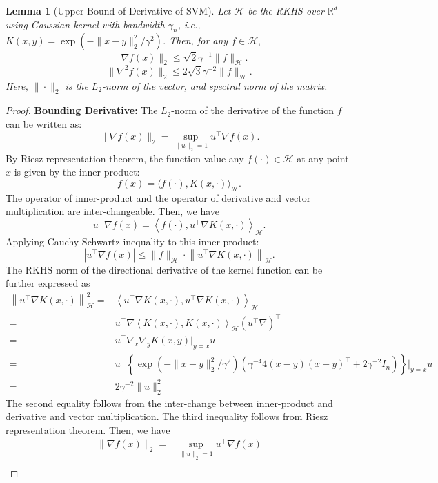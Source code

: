 \documentclass[12pt]{article}
\newtheorem{lemma}{Lemma}%
\newcommand{\R}{\mathbb{R}}
\begin{document}
\begin{lemma}[Upper Bound of Derivative of SVM]\label{lemma:derivative_svm}
Let $\mathcal{H}$ be the RKHS over $\R^{d}$ using Gaussian kernel with bandwidth $\gamma_n$, i.e., $K(x,y) = \exp(-\|x-y\|_2^2/\gamma^2)$. Then, for any $f\in\mathcal{H},$
$$\|\nabla f(x)\|_2 \leq  \sqrt{2}\gamma^{-1} \|f\|_{\mathcal{H}}.$$
$$\|\nabla^2 f(x)\|_2 \leq  2\sqrt{3}\gamma^{-2} \|f\|_{\mathcal{H}}.$$
Here, $\|\cdot\|_2$ is the $L_2$-norm of the vector, and spectral norm of the matrix.
\end{lemma}
\begin{proof}\textbf{Bounding Derivative:}
The $L_2$-norm of the derivative of the function  $f$ can be written as: 
    $$\|\nabla f(x)\|_2 = \sup_{\|u\|_2=1} u^\top \nabla f(x).$$
By Riesz representation theorem, the function value any $f(\cdot)\in \mathcal{H}$ at any point $x$ is given by the inner product:$$f(x) = \langle f(\cdot), K(x, \cdot) \rangle_{\mathcal{H}}.$$
The operator of inner-product and the operator of derivative and vector multiplication are inter-changeable. Then, we have
$$u^\top \nabla f(x) = \left\langle f(\cdot), u^\top \nabla K(x, \cdot) \right\rangle_{\mathcal{H}}.$$
Applying Cauchy-Schwartz inequality to this inner-product:
$$\left|u^\top \nabla f(x)\right| \leq \|f\|_{\mathcal{H}} \cdot \left\| u^\top \nabla K(x, \cdot)\right\|_{\mathcal{H}}.$$
The RKHS norm of the directional derivative of the kernel function can be further expressed as
\begin{align*}
    \left\| u^\top \nabla K(x, \cdot)\right\|^2_{\mathcal{H}}=& \left\langle u^\top \nabla K(x, \cdot), u^\top \nabla K(x, \cdot) \right\rangle_{\mathcal{H}}\\
    =& u^\top \nabla\left\langle  K(x, \cdot),  K(x, \cdot) \right\rangle_{\mathcal{H}}(u^\top \nabla)^\top\\
    = & u^\top\nabla_x \nabla_yK(x,y)|_{y=x}u\\
    = & u^\top\left\{\exp(-\|x-y\|_2^2/\gamma^2)\left(\gamma^{-4}4(x-y)(x-y)^\top +2\gamma^{-2}I_n\right)\right\}\big|_{y=x}u\\
    = & 2\gamma^{-2}\|u\|_2^2
\end{align*}
The second equality follows from the inter-change between inner-product and derivative and vector multiplication. The third inequality follows from Riesz representation theorem. Then, we have
\begin{align*}
    \|\nabla f(x)\|_2 = & \sup_{\|u\|_2=1} u^\top \nabla f(x)\\

\end{align*}
\end{proof}
\end{document}
